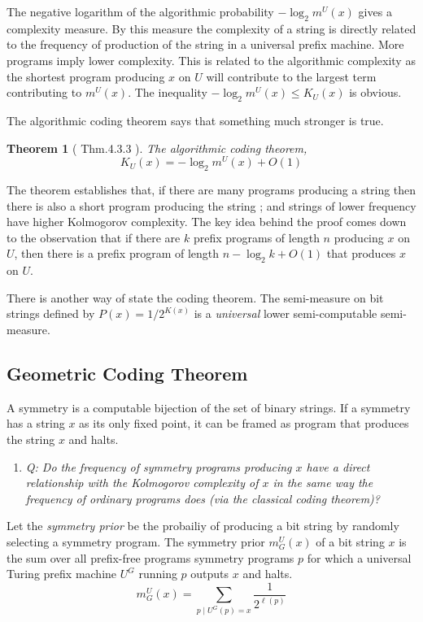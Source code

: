 \documentclass{article}
\newtheorem{theorem}{Theorem}[section]
\newcommand{\m}{m^U}
\newcommand{\ms}{m^U_G}
\begin{document}
The negative logarithm of the algorithmic probability $-\log_2 \m(x)$ gives a complexity measure. By this measure the complexity of a string is directly related to the frequency of production of the string in a universal prefix machine. More programs imply lower complexity. This is related to the algorithmic complexity as the shortest program producing $x$ on $U$ will contribute to the largest term contributing to $\m(x)$. The inequality $-\log_2 \m(x) \leq K_U(x)$ is obvious. 

The algorithmic coding theorem says that something much stronger is true. 
\begin{theorem} [\cite{LiVitanyi2008} Thm.4.3.3 ]
    \label{thm:coding} 
    The algorithmic coding theorem,
    \begin{equation}
    K_U(x) = -\log_2 \m(x) + O(1)
    \end{equation}
\end{theorem}
The theorem establishes that, if there are many programs producing a string then there is also a short program producing the string ; and strings of lower frequency have higher Kolmogorov complexity. The key idea behind the proof comes down to the observation that if there are $k$ prefix programs of length $n$ producing $x$ on $U$, then there is a prefix program of length $n - \log_2 k + O(1)$ that produces $x$ on $U$.

There is another way of state the coding theorem. The semi-measure on bit strings defined by $P(x) = 1/2^{K(x)}$ is a \emph{universal} lower semi-computable semi-measure.

\subsection{Geometric Coding Theorem}
A symmetry is a computable bijection of the set of binary strings. If a symmetry has a string $x$ as its only fixed point, it can be framed as program that produces the string $x$ and halts. 

\begin{enumerate}
    \item[]
    \emph{Q: Do the frequency of symmetry programs producing $x$ have a direct relationship with the Kolmogorov complexity of $x$ in the same way the frequency of ordinary programs does (via the classical coding theorem)? }
\end{enumerate}

Let the \emph{symmetry prior} be the probailiy of producing a bit string by randomly selecting a symmetry program. The symmetry prior $\ms(x)$ of a bit string $x$ is the sum over all prefix-free programs symmetry programs $p$ for which a universal Turing prefix machine $U^G$ running $p$ outputs $x$ and halts.
\begin{equation}
    \ms(x) = \sum_{p \mid U^G(p) = x} \frac{1}{2^{\ell(p)}}
\end{equation}
\end{document}
